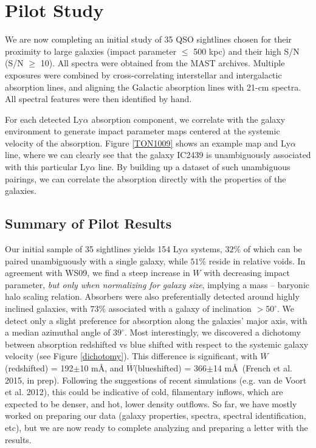 \documentclass[iop]{emulateapj-rtx4}
\begin{document}
\section{Pilot Study}

\indent We are now completing an initial study of 35 QSO sightlines chosen for their proximity to large galaxies (impact parameter $\leq$ 500 kpc) and their high S/N (S/N $\ge$ 10). All spectra were obtained from the MAST archives. Multiple exposures were combined by cross-correlating interstellar and intergalactic absorption lines, and aligning the Galactic absorption lines with 21-cm spectra. All spectral features were then identified by hand.


For each detected Ly$\alpha$ absorption component, we correlate with the galaxy environment to generate impact parameter maps centered at the systemic velocity of the absorption. Figure \ref{TON1009} shows an example map and Ly$\alpha$ line, where we can clearly see that the galaxy IC2439 is unambiguously associated with this particular Ly$\alpha$ line. By building up a dataset of such unambiguous pairings, we can correlate the absorption directly with the properties of the galaxies.

\vspace{10pt}
\subsection{Summary of Pilot Results}

\indent Our initial sample of 35 sightlines yields 154 Ly$\alpha$ systems, $32\%$ of which can be paired unambiguously with a single galaxy, while $51\%$ reside in relative voids. In agreement with WS09, we find a steep increase in $W$ with decreasing impact parameter, \textit{but only when normalizing for galaxy size}, implying a mass -- baryonic halo scaling relation. Absorbers were also preferentially detected around highly inclined galaxies, with $73\%$ associated with a galaxy of inclination $>50^{\circ}$. We detect only a slight preference for absorption along the galaxies' major axis, with a median azimuthal angle of $39^{\circ}$. Most interestingly, we discovered a dichotomy between absorption redshifted vs blue shifted with respect to the systemic galaxy velocity (see Figure \ref{dichotomy}). This difference is significant, with $\overline{W}$(redshifted) = 192$\pm$10 m\AA, and $\overline{W}$(blueshifted) = 366$\pm$14 m\AA~(French et al. 2015, in prep). Following the suggestions of recent simulations (e.g. van de Voort et al. 2012), this could be indicative of cold, filamentary inflows, which are expected to be denser, and hot, lower density outflows. So far, we have mostly worked on preparing our data (galaxy properties, spectra, spectral identification, etc), but we are now ready to complete analyzing and preparing a letter with the results.
\end{document}
